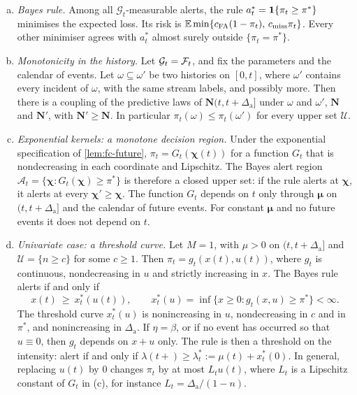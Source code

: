 \begin{theorem}\label{thm:alert}
\begin{enumerate}[(a)]
  \item \emph{Bayes rule.} Among all $\mathcal G_t$-measurable alerts, the rule
  $a^*_t=\mathbf{1}\!\left\{\pi_t\ge\pi^*\right\}$ minimises the expected loss. Its risk is
  $\mathbb{E}\min\{c_{\mathrm{FA}}(1-\pi_t),\,c_{\mathrm{miss}}\pi_t\}$. Every other minimiser
  agrees with $a^*_t$ almost surely outside $\{\pi_t=\pi^*\}$.
  \item \emph{Monotonicity in the history.} Let $\mathcal G_t=\mathcal{F}_t$, and fix the
  parameters and the calendar of events. Let $\omega\subseteq\omega'$ be two histories
  on $[0,t]$, where $\omega'$ contains every incident of $\omega$, with the same stream
  labels, and possibly more. Then there is a coupling of the predictive laws of
  $\bm N(t,t+\Delta_{\mathrm a}]$ under $\omega$ and $\omega'$, $\bm N$ and $\bm N'$, with
  $\bm N'\ge\bm N$. In particular $\pi_t(\omega)\le\pi_t(\omega')$ for every upper
  set $\mathcal U$.
  \item \emph{Exponential kernels: a monotone decision region.} Under the
  exponential specification of \cref{lem:fc-future}, $\pi_t=G_t(\bm\chi(t))$ for a
  function $G_t$ that is nondecreasing in each coordinate and Lipschitz. The Bayes
  alert region $\mathcal A_t=\{\bm\chi:G_t(\bm\chi)\ge\pi^*\}$ is therefore a closed
  upper set: if the rule alerts at $\bm\chi$, it alerts at every $\bm\chi'\ge\bm\chi$.
  The function $G_t$ depends on $t$ only through $\bm\mu$ on $(t,t+\Delta_{\mathrm a}]$ and the
  calendar of future events. For constant $\bm\mu$ and no future events it does not
  depend on $t$.
  \item \emph{Univariate case: a threshold curve.} Let $M=1$, with $\mu>0$ on
  $(t,t+\Delta_{\mathrm a}]$ and $\mathcal U=\{n\ge c\}$ for some $c\ge1$. Then
  $\pi_t=g_t(x(t),u(t))$, where $g_t$ is continuous, nondecreasing in $u$ and strictly
  increasing in $x$. The Bayes rule alerts if and only if
  \[
  x(t)\ \ge\ x^*_t(u(t)),\qquad x^*_t(u)=\inf\{x\ge0:g_t(x,u)\ge\pi^*\}<\infty .
  \]
  The threshold curve $x^*_t(u)$ is nonincreasing in $u$, nondecreasing in $c$ and in
  $\pi^*$, and nonincreasing in $\Delta_{\mathrm a}$. If $\eta=\beta$, or if no event has occurred
  so that $u\equiv0$, then $g_t$ depends on $x+u$ only. The rule is then a threshold on
  the intensity: alert if and only if $\lambda(t+)\ge\lambda^*_t:=\mu(t)+x^*_t(0)$.
  In general, replacing $u(t)$ by $0$ changes $\pi_t$ by at most $L_tu(t)$, where $L_t$
  is a Lipschitz constant of $G_t$ in (c), for instance $L_t=\Delta_{\mathrm a}/(1-n)$.
\end{enumerate}
\end{theorem}


